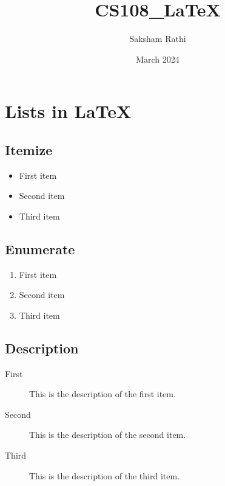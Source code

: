 \documentclass{article}
\title{CS108\_LaTeX}
\author{Saksham Rathi}
\date{March 2024}
\begin{document}
\maketitle
\section{Lists in \LaTeX}

\subsection{Itemize}

\begin{itemize}
    \item First item
    \item Second item
    \item Third item
\end{itemize}

\subsection{Enumerate}

\begin{enumerate}
    \item First item
    \item Second item
    \item Third item
\end{enumerate}

\subsection{Description}

\begin{description}
    \item[First] This is the description of the first item.
    \item[Second] This is the description of the second item.
    \item[Third] This is the description of the third item.
\end{description}
\end{document}
